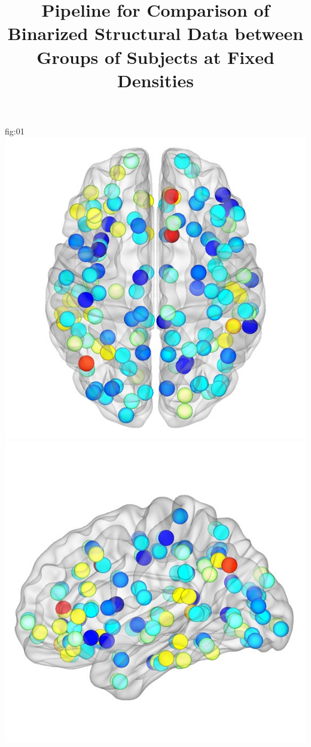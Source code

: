 \documentclass[justified]{tufte-handout}
\title{Pipeline for Comparison of Binarized Structural Data between Groups of Subjects at Fixed Densities}
\begin{document}
\maketitle

	{fig:01}
	{
	\includegraphics{fig_01_01.jpg}
	\includegraphics{fig_01_02.jpg}
}
\end{document}
